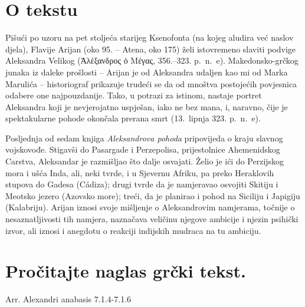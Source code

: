 


\section*{O tekstu}

Pišući po uzoru na pet stoljeća starijeg Ksenofonta (na kojeg aludira već naslov djela), Flavije Arijan (oko 95. – Atena, oko 175) želi istovremeno slaviti podvige Aleksandra Velikog (Ἀλέξανδρος ὁ Μέγας, 356.–323. p.~n.~e). Makedonsko-grčkog junaka iz daleke prošlosti – Arijan je od Aleksandra udaljen kao mi od Marka Marulića – historiograf prikazuje trudeći se da od mnoštva postojećih povjesnica odabere one najpouzdanije. Tako, u potrazi za istinom, nastaje portret Aleksandra koji je nevjerojatno uspješan, iako ne bez mana, i, naravno, čije je spektakularne pohode okončala prerana smrt (13.\ lipnja 323. p.~n.~e).

Posljednja od sedam knjiga \textit{Aleksandrova pohoda}  pripovijeda o kraju slavnog vojskovođe. Stigavši do Pasargade i Perzepolisa, prijestolnice Ahemenidskog Carstva, Aleksandar je razmišljao što dalje osvajati. Želio je ići do Perzijskog mora i ušća Inda, ali, neki tvrde, i u Sjevernu Afriku, pa preko Heraklovih stupova do Gadesa (Cádiza); drugi tvrde da je namjeravao osvojiti Skitiju i Meotsko jezero (Azovsko more); treći, da je planirao i pohod na Siciliju i Japigiju (Kalabriju). Arijan iznosi svoje mišljenje o Aleksandrovim namjerama, točnije o nesaznatljivosti tih namjera, naznačava veličinu njegove ambicije i njezin psihički izvor, ali iznosi i anegdotu o reakciji indijskih mudraca na tu ambiciju.

\newpage

\section*{Pročitajte naglas grčki tekst.}

Arr. Alexandri anabasis 7.1.4-7.1.6


\medskip


